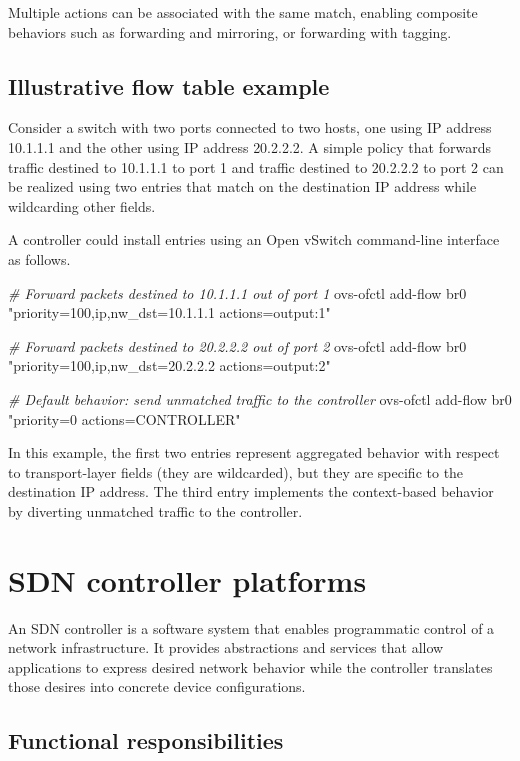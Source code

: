 \documentclass[11pt,a4paper,openany]{report}
\begin{document}
Multiple actions can be associated with the same match, enabling composite behaviors such as forwarding and mirroring, or forwarding with tagging.

\subsection{Illustrative flow table example}

Consider a switch with two ports connected to two hosts, one using IP address 10.1.1.1 and the other using IP address 20.2.2.2. A simple policy that forwards traffic destined to 10.1.1.1 to port 1 and traffic destined to 20.2.2.2 to port 2 can be realized using two entries that match on the destination IP address while wildcarding other fields.

A controller could install entries using an Open vSwitch command-line interface as follows.

\emph{\# Forward packets destined to 10.1.1.1 out of port 1} ovs-ofctl add-flow br0 "priority=100,ip,nw\_dst=10.1.1.1 actions=output:1"

\emph{\# Forward packets destined to 20.2.2.2 out of port 2} ovs-ofctl add-flow br0 "priority=100,ip,nw\_dst=20.2.2.2 actions=output:2"

\emph{\# Default behavior: send unmatched traffic to the controller} ovs-ofctl add-flow br0 "priority=0 actions=CONTROLLER"

In this example, the first two entries represent aggregated behavior with respect to transport-layer fields (they are wildcarded), but they are specific to the destination IP address. The third entry implements the context-based behavior by diverting unmatched traffic to the controller.

\section{SDN controller platforms}

An SDN controller is a software system that enables programmatic control of a network infrastructure. It provides abstractions and services that allow applications to express desired network behavior while the controller translates those desires into concrete device configurations.

\subsection{Functional responsibilities}
\end{document}

